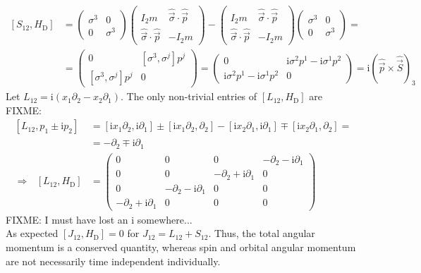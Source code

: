 \documentclass[english, parskip=full]{scrartcl}
\newcommand{\klam}{}
\newcommand{\tecxt}{}
\def\I{\text{i}}
\begin{document}
\begin{align*}
\klam\left[ {S_{12},H_\tecxt\text{D}} \right]&=\begin{pmatrix}
\sigma^3&0\\ 0&\sigma^3
\end{pmatrix}\begin{pmatrix}
I_2m&\hat{\vec{\sigma}}\cdot\hat{\vec{p}} \\ \hat{\vec{\sigma}}\cdot\hat{\vec{p}} & -I_2m
\end{pmatrix}-\begin{pmatrix}
I_2m&\hat{\vec{\sigma}}\cdot\hat{\vec{p}} \\ \hat{\vec{\sigma}}\cdot\hat{\vec{p}} & -I_2m
\end{pmatrix}\begin{pmatrix}
\sigma^3&0\\ 0&\sigma^3
\end{pmatrix}=\\
&=\begin{pmatrix}
0&\klam\left[ {\sigma^3,\sigma^j} \right]p^j \\ \klam\left[ {\sigma^3,\sigma^j} \right]p^j & 0
\end{pmatrix}=\begin{pmatrix}
0&\I\sigma^2p^1-\I\sigma^1p^2\\
\I\sigma^2p^1-\I\sigma^1p^2&0
\end{pmatrix}=\I (\hat{\vec{p}}\times\hat{\vec{S}})_3
\end{align*}
Let $L_{12}=\I(x_1\partial_2-x_2\partial_1)$. The only non-trivial entries of $\klam\left[ {L_{12},H_\tecxt\text{D}} \right]$ are FIXME:
\begin{align*}
\klam\left[ {L_{12},p_1\pm\I p_2} \right]&=\klam\left[ {\I x_1\partial_2,\I\partial_1} \right]\pm\klam\left[ {\I x_1\partial_2,\partial_2} \right]-\klam\left[ {\I x_2\partial_1,\I\partial_1} \right]\mp\klam\left[ {\I x_2\partial_1,\partial_2} \right]=\\
&=-\partial_2\mp\I\partial_1\\
\Rightarrow\ \ \ \klam\left[ {L_{12},H_\tecxt\text{D}} \right]&=\begin{pmatrix}
0&0&0&-\partial_2-\I\partial_1\\
0&0&-\partial_2+\I\partial_1&0\\
0&-\partial_2-\I\partial_1&0&0\\
-\partial_2+\I\partial_1&0&0&0
\end{pmatrix}
\end{align*}
FIXME: I must have lost an i somewhere...\\
As expected $\klam\left[ {J_{12},H_\tecxt\text{D}} \right]=0$ for $J_{12}=L_{12}+S_{12}$. Thus, the total angular momentum is a conserved quantity, whereas spin and orbital angular momentum are not necessarily time independent individually.
\end{document}
